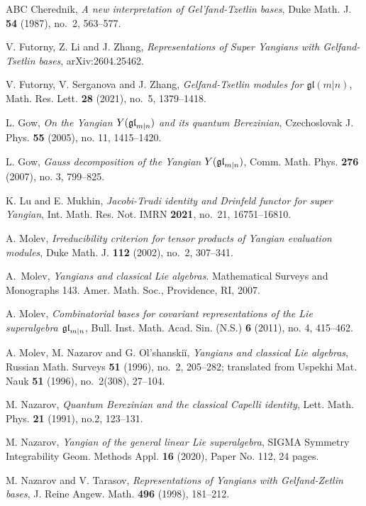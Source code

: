\documentclass[12pt]{amsart}
\begin{document}

\begin{thebibliography}{ABC}%
{Cherednik},
{\it A new interpretation of Gel'fand-Tzetlin bases},
Duke Math. J. {\bf 54} (1987), no.~2, 563--577.

{V. Futorny, Z. Li and J. Zhang},
{\it Representations of Super Yangians with Gelfand-Tsetlin bases},
arXiv:2604.25462.

{V. Futorny, V. Serganova and J. Zhang},
{\it Gelfand-Tsetlin modules for $\mathfrak{gl}(m|n)$},
Math. Res. Lett. {\bf 28} (2021), no.~5, 1379--1418.

{L. Gow},
{\it  On the {Y}angian {$Y(\mathfrak{gl}_{m|n})$} and its quantum {B}erezinian},
Czechoslovak J. Phys. {\bf 55} (2005), no. 11, 1415--1420.

{L. Gow},
{\it  Gauss decomposition of the {Y}angian {$Y(\mathfrak{gl}_{m|n})$}},
Comm. Math. Phys. {\bf 276} (2007), no. 3, 799--825.

{K. Lu and E. Mukhin},
{\it Jacobi-Trudi identity and Drinfeld functor for super Yangian},
Int. Math. Res. Not. IMRN {\bf 2021}, no.~21, 16751--16810.

{A. Molev},
{\it Irreducibility criterion for tensor products of Yangian evaluation modules},
 Duke Math. J. {\bf 112} (2002), no.~2, 307--341.

{A.~Molev},
{\em Yangians and classical Lie algebras}.
Mathematical Surveys and Monographs
143. Amer. Math. Soc., Providence, RI, 2007.

{A. Molev},
{\it  Combinatorial bases for covariant representations of the {L}ie superalgebra {$\mathfrak{gl}_{m|n}$}},
Bull. Inst. Math. Acad. Sin. (N.S.) {\bf 6} (2011), no. 4, 415--462.

{A. Molev, M. Nazarov and G. Ol'shanski\u i},
{\it Yangians and classical Lie algebras},
Russian Math. Surveys {\bf 51} (1996), no.~2, 205--282; translated from Uspekhi Mat. Nauk {\bf 51} (1996), no.~2(308), 27--104.

{M. Nazarov},
{\it  Quantum {B}erezinian and the classical {C}apelli identity},
Lett. Math. Phys. {\bf 21} (1991), no.2, 123--131.

{M. Nazarov},
{\it Yangian of the general linear Lie superalgebra},
SIGMA Symmetry Integrability Geom. Methods Appl. {\bf 16} (2020), Paper No. 112, 24 pages.

{M. Nazarov and V. Tarasov},
{\it  Representations of {Y}angians with {G}elfand-{Z}etlin bases},
J. Reine Angew. Math. {\bf 496} (1998), 181--212.



\end{thebibliography}
\end{document}
